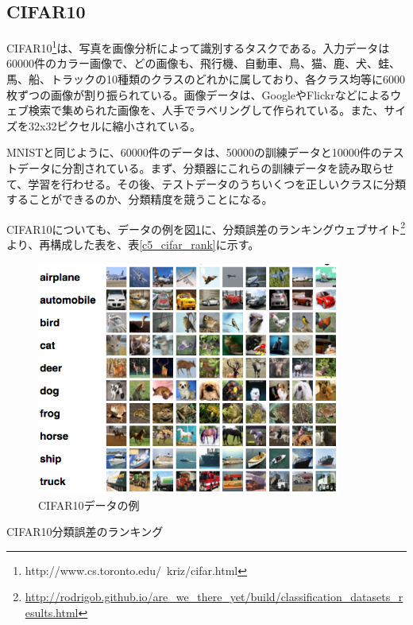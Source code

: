 \subsection{CIFAR10}
CIFAR10\footnote{http://www.cs.toronto.edu/~kriz/cifar.html}は、写真を画像分析によって識別するタスクである\cite{krizhevsky2009learning}。入力データは60000件のカラー画像で、どの画像も、飛行機、自動車、鳥、猫、鹿、犬、蛙、馬、船、トラックの10種類のクラスのどれかに属しており、各クラス均等に6000枚ずつの画像が割り振られている。画像データは、GoogleやFlickrなどによるウェブ検索で集められた画像を、人手でラベリングして作られている。また、サイズを32x32ピクセルに縮小されている。\par
MNISTと同じように、60000件のデータは、50000の訓練データと10000件のテストデータに分割されている。まず、分類器にこれらの訓練データを読み取らせて、学習を行わせる。その後、テストデータのうちいくつを正しいクラスに分類することができるのか、分類精度を競うことになる。\par
CIFAR10についても、データの例を図\ref{c5_cifar_ex}に、分類誤差のランキングウェブサイト\footnote{\url{http://rodrigob.github.io/are_we_there_yet/build/classification_datasets_results.html}}より、再構成した表を、表\ref{c5_cifar_rank}に示す。
\begin{figure}[tbp]
 \begin{center}
  \includegraphics[width=100mm]{img/c5/cifar_ex}
 \end{center}
 \caption{CIFAR10データの例}
 \label{c5_cifar_ex}
\end{figure}


\begin{table}[tbp]
 \begin{center}
  \caption{CIFAR10分類誤差のランキング}
 
 \end{center}

 \label{c5_cifar_rank}
\end{table}

